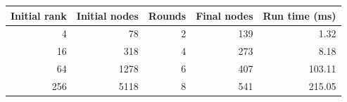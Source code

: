 \begin{tabular}{rrrrr}
\toprule
Initial rank & Initial nodes & Rounds & Final nodes & Run time (ms) \\
\midrule
4 & 78 & 2 & 139 & 1.32\\
16 & 318 & 4 & 273 & 8.18\\
64 & 1278 & 6 & 407 & 103.11\\
256 & 5118 & 8 & 541 & 215.05\\
\bottomrule
\end{tabular}
